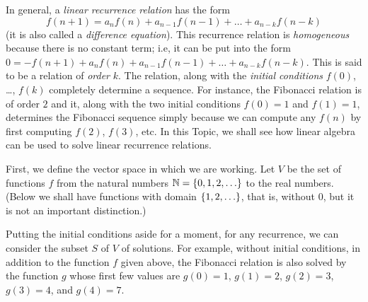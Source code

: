 In general, a 
\emph{linear recurrence relation} 
has the form
\begin{equation*}
  f(n+1)=a_nf(n)+a_{n-1}f(n-1)+\dots+a_{n-k}f(n-k)
\end{equation*}
(it is also called a \emph{difference equation}).
This recurrence relation is 
\emph{homogeneous}%
because there is no constant term; i.e, it can be put into
the form $0=-f(n+1)+a_nf(n)+a_{n-1}f(n-1)+\dots+a_{n-k}f(n-k)$.
This is said to be a relation of \emph{order} $k$.
The relation, along with the 
\emph{initial conditions} 
$f(0)$, \ldots, $f(k)$
completely determine a sequence. 
For instance, 
the Fibonacci relation is of order $2$ and it, 
along with the two initial conditions $f(0)=1$ and $f(1)=1$,
determines the Fibonacci sequence simply because 
we can compute any $f(n)$ by first computing $f(2)$, $f(3)$, etc.
In this Topic, we shall see how linear algebra can be used to solve linear
recurrence relations.

First, we define the vector space in which we are working.
Let $V$ be the set of functions $f$
from the natural numbers $\mathbb{N}=\mbox{$\{0,1,2,\ldots\}$}$ to the real numbers.
(Below we shall have functions with domain $\mbox{$\{1,2,\ldots\}$}$, that is, 
without $0$, but it is not an important distinction.)

Putting the initial conditions aside for a moment,
for any recurrence, we can consider the subset $S$ of $V$ of solutions. 
For example, without initial conditions, in addition to the
function $f$ given above, the Fibonacci relation 
is also solved by the function $g$ whose 
first few values are $g(0)=1$, $g(1)=2$, $g(2)=3$, $g(3)=4$, and
$g(4)=7$.

